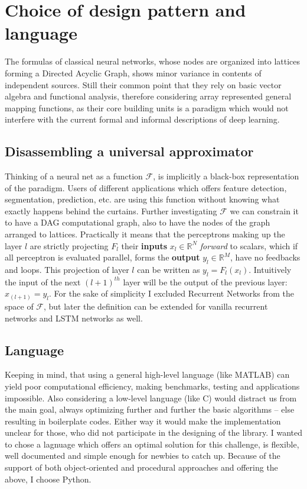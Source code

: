 \section{Choice of design pattern and language}

The formulas of classical neural networks, whose nodes are organized into lattices forming a Directed Acyclic Graph, shows minor variance in contents of independent sources. Still their common point that they rely on basic vector algebra and functional analysis, therefore considering array represented general mapping functions, as their core building units is a paradigm which would not interfere with the current formal and informal descriptions of deep learning.

\subsection{Disassembling a universal approximator}
Thinking of a neural net as a function \(\mathcal{F}\), is implicitly a black-box representation of the paradigm.
Users of different applications which offers feature detection, segmentation, prediction, etc. are using this function without knowing what exactly happens behind the curtains. 
Further investigating \(\mathcal{F}\) we can constrain it to have a DAG computational graph, also to have the nodes of the graph arranged to lattices.
Practically it means that the perceptrons making up the layer \(l\) are strictly projecting $F_l$ their \textbf{inputs} 
$ x_l \in \mathbb{R}^N $ \emph{forward} to scalars, which if all perceptron is evaluated parallel, forms the 
\textbf{output} $y_l \in \mathbb{R}^M$, have no feedbacks and loops. 
This projection of layer $l$ can be written as $y_l = F_l(x_l)$. 
Intuitively the input of the next $(l+1)^{th}$ layer will be the output of the previous layer:
$x_{(l+1)} = y_l$.
For the sake of simplicity I excluded Recurrent Networks from the space of $\mathcal{F}$, but later the definition can be extended for vanilla recurrent networks and LSTM networks as well.

\subsection{Language} Keeping in mind, that using a general high-level language (like MATLAB) can yield poor computational efficiency, making benchmarks, testing and applications impossible.
Also considering a low-level language (like C) would distract us from the main goal, always optimizing further and further the basic algorithms -- else resulting in boilerplate codes. Either way it would make the implementation unclear for those, who did not participate in the designing of the library.
I wanted to chose a lagnuage which offers an optimal solution for this challenge, is flexible, well documented and simple enough for newbies to catch up.
Because of the support of both object-oriented and procedural approaches and offering the above, I choose Python.

